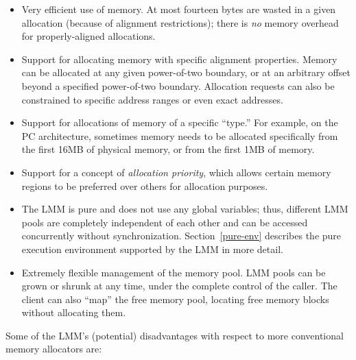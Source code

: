 \begin{itemize}
\item	Very efficient use of memory.
	At most fourteen bytes are wasted in a given allocation
	(because of alignment restrictions);
	there is \emph{no} memory overhead for properly-aligned allocations.

\item	Support for allocating memory with specific alignment properties.
	Memory can be allocated at any given power-of-two boundary,
	or at an arbitrary offset beyond a specified power-of-two boundary.
	Allocation requests can also be constrained to specific address ranges
	or even exact addresses.

\item	Support for allocations of memory of a specific ``type.''
	For example, on the PC architecture,
	sometimes memory needs to be allocated specifically
	from the first 16MB of physical memory, or from the first 1MB of memory.

\item	Support for a concept of \emph{allocation priority},
	which allows certain memory regions to be preferred over others
	for allocation purposes.

\item	The LMM is pure and does not use any global variables;
	thus, different LMM pools are completely independent of each other
	and can be accessed concurrently without synchronization.
	Section~\ref{pure-env} describes the pure execution environment
	supported by the LMM in more detail.

\item	Extremely flexible management of the memory pool.
	LMM pools can be grown or shrunk at any time,
	under the complete control of the caller.
	The client can also ``map'' the free memory pool,
	locating free memory blocks without allocating them.
\end{itemize}

Some of the LMM's (potential) disadvantages
with respect to more conventional memory allocators are:

